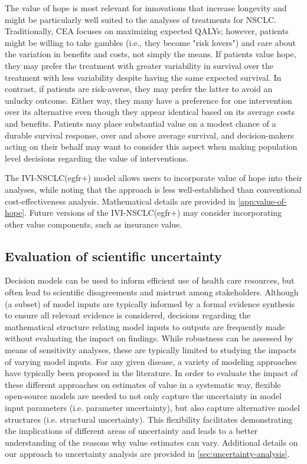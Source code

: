 \documentclass[11pt,final,fleqn]{article}\usepackage[]{graphicx}\usepackage[]{color}
\theoremstyle{plain}
\begin{document}
{The value of hope is most relevant for innovations that increase longevity and might be particularly well suited to the analyses of treatments for NSCLC. Traditionally, CEA focuses on maximizing expected QALYs; however, patients might be willing to take gambles (i.e., they become "risk lovers") and care about the variation in benefits and costs, not simply the means. If patients value hope, they may prefer the treatment with greater variability in survival over the treatment with less variability despite having the same expected survival. In contrast, if patients are risk-averse, they may prefer the latter to avoid an unlucky outcome. Either way, they many have a preference for one intervention over its alternative even though they appear identical based on its average costs and benefits. Patients may place substantial value on a modest chance of a durable survival response, over and above average survival, and decision-makers acting on their behalf may want to consider this aspect when making population level decisions regarding the value of interventions. 

The IVI-NSCLC(egfr+) model allows users to incorporate value of hope into their analyses, while noting that the approach is less well-established than conventional cost-effectiveness analysis. Mathematical details are provided in \autoref{app:value-of-hope}. Future versions of the IVI-NSCLC(egfr+) may consider incorporating other value components, such as insurance value.

\subsection{Evaluation of scientific uncertainty}
Decision models can be used to inform efficient use of health care resources, but often lead to scientific disagreements and mistrust among stakeholders. Although (a subset) of model inputs are typically informed by a formal evidence synthesis to ensure all relevant evidence is considered, decisions regarding the mathematical structure relating model inputs to outputs are frequently made without evaluating the impact on findings. While robustness can be assessed by means of sensitivity analyses, these are typically limited to studying the impacts of varying model inputs. For any given disease, a variety of modeling approaches have typically been proposed in the literature. In order to evaluate the impact of these different approaches on estimates of value in a systematic way,  flexible open-source models are needed to not only capture the uncertainty in model input parameters (i.e. parameter uncertainty), but also capture alternative model structures (i.e. structural uncertainty). This flexibility facilitates demonstrating the implications of different areas of uncertainty and leads to a better understanding of the reasons why value estimates can vary. Additional details on our approach to uncertainty analysis are provided in \autoref{sec:uncertainty-analysis}.


}
\end{document}
